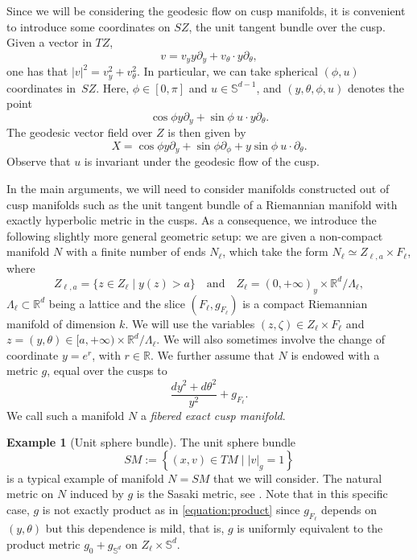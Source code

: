 \documentclass[10pt]{amsart}
\newcommand{\quand}{\quad\text{and}\quad}
\newcommand{\R}{\mathbb{R}}
\newcommand{\Ss}{\mathbb{S}}
\theoremstyle{plain}
\theoremstyle{definition}
\newtheorem{example}{Example}[section]
\begin{document}
Since we will be considering the geodesic flow on cusp manifolds, it is convenient to introduce some coordinates on $SZ$, the unit tangent bundle over the cusp. Given a vector in $TZ$,\vspace*{-3pt}
\[
v = v_y y\partial_y + v_\theta\cdot y\partial_\theta,
\]
one has that $|v|^2 = v_y^2 + v_\theta^2$. In particular, we can take spherical $(\phi,u)$ coordinates in~$SZ$. Here, $\phi\in [0,\pi]$ and $u\in \Ss^{d-1}$, and $(y,\theta,\phi,u)$ denotes the point\vspace*{-3pt}
\[
\cos\phi y\partial_y + \sin\phi~ u\cdot y\partial_\theta.
\]
The geodesic vector field over $Z$ is then given by\vspace*{-3pt}
\begin{equation}\label{equation:x}
X = \cos\phi y\partial_y + \sin\phi \partial_\phi + y \sin\phi ~u\cdot \partial_\theta.
\end{equation}
Observe that $u$ is invariant under the geodesic flow of the cusp.

In the main arguments, we will need to consider manifolds constructed out of cusp manifolds such as the unit tangent bundle of a Riemannian manifold with exactly hyperbolic metric in the cusps. As a consequence, we introduce the following slightly more general geometric setup: we are given a non-compact manifold $N$ with a finite number of ends $N_\ell$, which take the form $N_\ell \simeq Z_{\ell,a}\times F_\ell$, where
\[
Z_{\ell,a} = \{ z \in Z_\ell\mid y(z)> a\}\quand Z_\ell =(0,+\infty)_y \times \R^d/\Lambda_\ell,
\]
$\Lambda_\ell \subset \R^d$ being a lattice and the slice $(F_\ell,g_{F_\ell})$ is a compact Riemannian manifold of dimension $k$. We will use the variables $(z,\zeta) \in Z_\ell \times F_\ell$ and $z=(y,\theta) \in [a,+\infty) \times \R^d/\Lambda_\ell$. We will also sometimes involve the change of coordinate $y = e^{r}$, with $r \in \R$. We further assume that $N$ is endowed with a metric $g$, equal over the cusps to
\begin{equation}
\label{equation:product}
\frac{dy^2 + d\theta^2}{y^2} + g_{F_\ell}.
\end{equation}
We call such a manifold $N$ a \emph{fibered exact cusp manifold}.

\begin{example}[Unit sphere bundle]
The unit sphere bundle
\[
SM := \left\{(x,v) \in TM \mid |v|_g=1\right\}
\]
is a typical example of manifold $N=SM$ that we will consider. The natural metric on $N$ induced by $g$ is the Sasaki metric, see \cite[App.\,A.3.2]{Bonthonneau-15}. Note that in this specific case, $g$ is not exactly product as in \eqref{equation:product} since $g_{F_\ell}$ depends on $(y,\theta)$ but this dependence is mild, that is, $g$ is uniformly equivalent to the product metric $g_0 + g_{\Ss^d}$ on $Z_\ell \times \Ss^d$.
\end{example}
\end{document}
